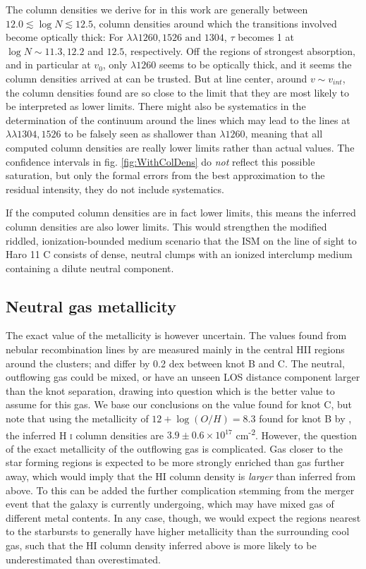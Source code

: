 \documentclass[twocolumn]{aastex61}
\begin{document}
The column densities we derive for  in this work are
generally between $12.0 \lesssim \log N \lesssim 12.5$, column densities
around which the transitions involved become optically thick: For
$\lambda \lambda 1260, 1526 \text{ and } 1304$, $\tau$ becomes 1 at
$\log N \sim 11.3, 12.2$ and $12.5$, respectively. Off the regions of
strongest absorption, and in particular at $v_0$, only $\lambda 1260$
seems to be optically thick, and it seems the column densities arrived
at can be trusted. But at line center, around $v\sim v_{int}$, the
column densities found are so close to the limit that they are most
likely to be interpreted as lower limits. There might also be
systematics in the determination of the continuum around the lines which
may lead to the lines at $\lambda \lambda 1304, 1526$ to be falsely seen
as shallower than $\lambda 1260$, meaning that all computed column
densities are really lower limits rather than actual values. The
confidence intervals in fig. \ref{fig:WithColDens} do \emph{not} reflect
this possible saturation, but only the formal errors from the best
approximation to the residual intensity, they do not include
systematics.

If the computed column densities are in fact lower limits, this means
the inferred  column densities are also lower limits. This
would strengthen the modified riddled, ionization-bounded medium
scenario that the ISM on the line of sight to Haro 11 C consists of
dense, neutral clumps with an ionized interclump medium containing a
dilute neutral component.

\subsection{Neutral gas metallicity}\label{neutral-gas-metallicity}

The exact value of the metallicity is however uncertain. The values
found from nebular recombination lines by \citet{Guseva2012} are
measured mainly in the central HII regions around the clusters; and
differ by 0.2 dex between knot B and C. The neutral, outflowing gas
could be mixed, or have an unseen LOS distance component larger than the
knot separation, drawing into question which is the better value to
assume for this gas. We base our conclusions on the value found for knot
C, but note that using the metallicity of $12 + \log (O/H) = 8.3$ found
for knot B by \citet{Guseva2012}, the inferred H \textsc{i} column
densities are $3.9 \pm 0.6 \times 10^{17}$ cm\textsuperscript{-2}.
However, the question of the exact metallicity of the outflowing gas is
complicated. Gas closer to the star forming regions is expected to be
more strongly enriched than gas further away, which would imply that the
HI column density is \emph{larger} than inferred from  above.
To this can be added the further complication stemming from the merger
event that the galaxy is currently undergoing, which may have mixed gas
of different metal contents. In any case, though, we would expect the
regions nearest to the starbursts to generally have higher metallicity
than the surrounding cool gas, such that the HI column density inferred
above is more likely to be underestimated than overestimated.
\end{document}
